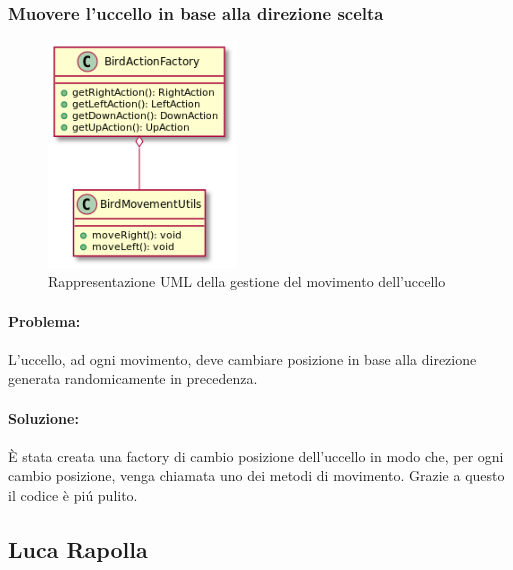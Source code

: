 \documentclass[a4paper,12pt]{report}
\begin{document}
\newpage
\subsubsection{Muovere l’uccello in base alla direzione scelta}
\begin{figure}[H]
    \centering{}
    \includegraphics[width=5cm]{img/actionfact.png}
    \caption{Rappresentazione UML della gestione del movimento dell'uccello}
    \label{fig:my_label}
\end{figure}

\paragraph{Problema:} L’uccello, ad ogni movimento, deve cambiare posizione in base alla direzione generata randomicamente in precedenza.

\paragraph{Soluzione:} È stata creata una factory di cambio posizione dell’uccello in modo che, per ogni cambio posizione, venga chiamata uno dei metodi di movimento. Grazie a questo il codice è piú pulito.

\newpage
\subsection{Luca Rapolla}
\end{document}

